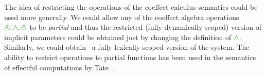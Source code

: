 The idea of restricting the operations of the coeffect calculus semantics could be used more
generally. We could allow any of the coeffect algebra operations $\cseq, \czip, \cpar$ to be
\emph{partial} and thus the restricted (fully dynamically-scoped) version of implicit parameters
could be obtained just by changing the definition of $\czip$. Similarly, we could obtain \eg~a
fully lexically-scoped version of the system. The ability to restrict operations to partial 
functions has been used in the semantics of effectful computations by Tate~\cite{effects-producer-semantics}.












~